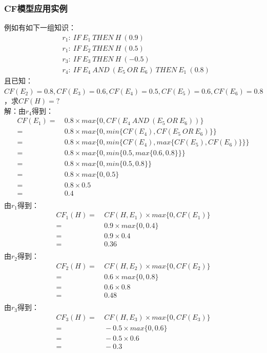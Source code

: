 \documentclass[12pt]{article}
\begin{document}
\subsubsection{CF模型应用实例}
例如有如下一组知识：
\[
	\begin{split}
		&r_1:\ IF\ E_1\ THEN\ H\ (0.9)\\
		&r_1:\ IF\ E_2\ THEN\ H\ (0.5)\\
		&r_3:\ IF\ E_3\ THEN\ H\ (-0.5)\\
		&r_4:\ IF\ E_4\ AND\ (E_5\ OR\ E_6)\ THEN\ E_1\ (0.8)
	\end{split}
\]
且已知：$CF(E_2)=0.8,CF(E_3)=0.6,CF(E_4)=0.5,CF(E_5)=0.6,CF(E_6)=0.8$，求$CF(H)=?$\\
解：由$r_4$得到：
\[
	\begin{aligned}
		CF(E_1)=&\ 0.8\times max\{0,CF(E_4\ AND\ (E_5\ OR\ E_6))\}\\
		=&\ 0.8\times max\{0,min\{CF(E_4),CF(E_5\ OR\ E_6)\}\}\\
		=&\ 0.8\times max\{0,min\{CF(E_4),max\{CF(E_5),CF(E_6)\}\}\}\\
		=&\ 0.8\times max\{0,min\{0.5,max\{0.6,0.8\}\}\}\\
		=&\ 0.8\times max\{0,min\{0.5,0.8\}\}\\
		=&\ 0.8\times max\{0,0.5\}\\
		=&\ 0.8\times 0.5\\
		=&\ 0.4\\
	\end{aligned}
\]
由$r_1$得到：
\[
	\begin{aligned}
		CF_1(H)=&\ CF(H,E_1)\times max\{0,CF(E_1)\}\\
		=&\ 0.9\times max\{0,0.4\}\\
		=&\ 0.9\times 0.4\\
		=&\ 0.36\\
	\end{aligned}
\]
由$r_2$得到：
\[
	\begin{aligned}
		CF_2(H)=&\ CF(H,E_2)\times max\{0,CF(E_2)\}\\
		=&\ 0.6\times max\{0,0.8\}\\
		=&\ 0.6\times 0.8\\
		=&\ 0.48\\
	\end{aligned}
\]
由$r_3$得到：
\[
	\begin{aligned}
		CF_3(H)=&\ CF(H,E_3)\times max\{0,CF(E_3)\}\\
		=&\ -0.5\times max\{0,0.6\}\\
		=&\ -0.5\times 0.6\\
		=&\ -0.3\\
	\end{aligned}
\]
\end{document}
